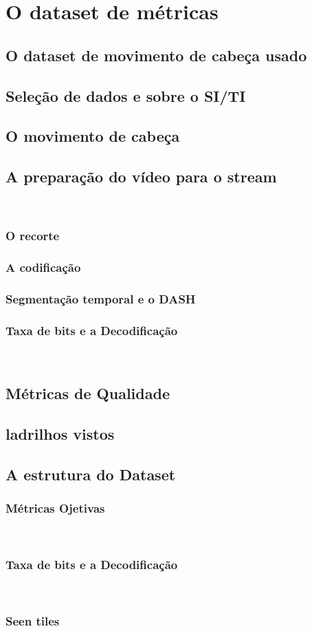 
\chapter{O dataset de métricas}\label{Cap:Dataset}

\section{O dataset de movimento de cabeça usado}
\section{Seleção de dados e sobre o SI/TI}
\section{O movimento de cabeça}
\section{A preparação do vídeo para o stream}\\
\subsection{O recorte}
\subsection{A codificação}
\subsection{Segmentação temporal e o DASH}
\subsection{Taxa de bits e a Decodificação}\\
\section{Métricas de Qualidade}
\section{ladrilhos vistos}
\section{A estrutura do Dataset}
\subsection{Métricas Ojetivas}\\
\subsection{Taxa de bits e a Decodificação}\\
\subsection{Seen tiles}\\


